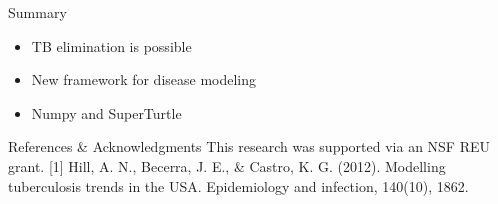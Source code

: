 \documentclass[final]{beamer}
\begin{document}
\begin{frame}
\begin{columns}[T]
\begin{column}{.3\textwidth}
      \begin{block}{Summary}
        \begin{itemize}
          \item TB elimination is possible
          \item New framework for disease modeling
          \item Numpy and SuperTurtle
        \end{itemize}
      \end{block}
      \begin{block}{References \& Acknowledgments}
        This research was supported via an NSF REU grant. 
        \small{[1] Hill, A. N., Becerra, J. E., \& Castro, K. G. (2012). Modelling
          tuberculosis trends in the USA. Epidemiology and infection, 140(10),
          1862.}
      \end{block}
      
    \end{column}
  \end{columns}
\end{frame}
\end{document}
